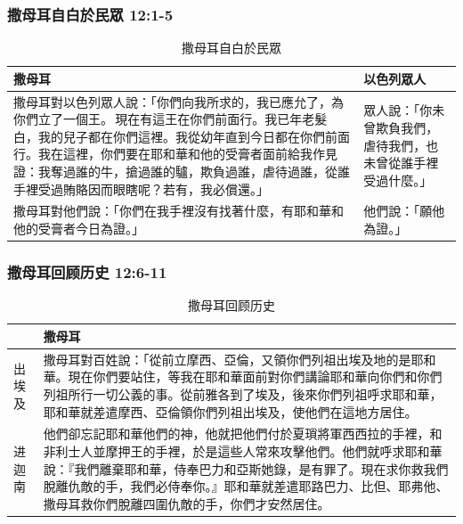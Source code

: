 \subsubsection{撒母耳自白於民眾 12:1-5} 
\begin{table}[!hbp]
\centering 
\begin{tabular}{p{13.5cm}|p{3.7cm}}\hline\hline
撒母耳&以色列眾人\\\hline
撒母耳對以色列眾人說：「你們向我所求的，我已應允了，為你們立了一個王。 現在有這王在你們前面行。我已年老髮白，我的兒子都在你們這裡。我從幼年直到今日都在你們前面行。我在這裡，你們要在耶和華和他的受膏者面前給我作見證：我奪過誰的牛，搶過誰的驢，欺負過誰，虐待過誰，從誰手裡受過賄賂因而眼瞎呢？若有，我必償還。」 
&眾人說：「你未曾欺負我們，虐待我們，也未曾從誰手裡受過什麼。」   \\\hline
撒母耳對他們說：「你們在我手裡沒有找著什麼，有耶和華和他的受膏者今日為證。」
&他們說：「願他為證。」\\\hline
\end{tabular}
\caption{撒母耳自白於民眾}
\end{table}

\subsubsection{撒母耳回顾历史 12:6-11} 
\begin{table}[H]
\centering 
\begin{tabular}{p{.4cm}p{}}\\\hline
&撒母耳\\\hline
出埃及&撒母耳對百姓說：「從前立摩西、亞倫，又領你們列祖出埃及地的是耶和華。現在你們要站住，等我在耶和華面前對你們講論耶和華向你們和你們列祖所行一切公義的事。從前雅各到了埃及，後來你們列祖呼求耶和華，耶和華就差遣摩西、亞倫領你們列祖出埃及，使他們在這地方居住。\\\hline
进迦南&他們卻忘記耶和華他們的神，他就把他們付於夏瑣將軍西西拉的手裡，和非利士人並摩押王的手裡，於是這些人常來攻擊他們。他們就呼求耶和華說：『我們離棄耶和華，侍奉巴力和亞斯她錄，是有罪了。現在求你救我們脫離仇敵的手，我們必侍奉你。』耶和華就差遣耶路巴力、比但、耶弗他、撒母耳救你們脫離四圍仇敵的手，你們才安然居住。\\\hline
\end{tabular}
\caption{撒母耳回顾历史}
\end{table}

